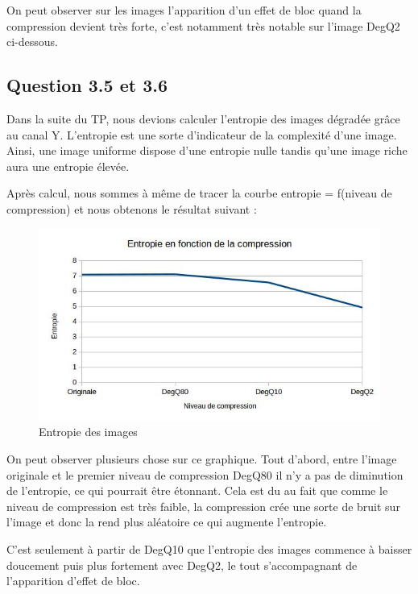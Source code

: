 \documentclass[12pt]{report}
\begin{document}
On peut observer sur les images l'apparition d'un effet de bloc quand la compression devient très forte, c'est notamment très notable sur l'image DegQ2 ci-dessous.

\subsection{Question 3.5 et 3.6}

Dans la suite du TP, nous devions calculer l'entropie des images dégradée grâce au canal Y. L'entropie est une sorte d'indicateur de la complexité d'une image. Ainsi, une image uniforme dispose d'une entropie nulle tandis qu'une image riche aura une entropie élevée.

Après calcul, nous sommes à même de tracer la courbe entropie = f(niveau de compression) et nous obtenons le résultat suivant :

\begin{figure}[H]
\begin{center}
\includegraphics[scale=0.8]{../ImageRes/entropie.jpg} 
\caption{Entropie des images}
\end{center}
\end{figure}

On peut observer plusieurs chose sur ce graphique. Tout d'abord, entre l'image originale et le premier niveau de compression DegQ80 il n'y a pas de diminution de l'entropie, ce qui pourrait être étonnant. Cela est du au fait que comme le niveau de compression est très faible, la compression crée une sorte de bruit sur l'image et donc la rend plus aléatoire ce qui augmente l'entropie. 

C'est seulement à partir de DegQ10 que l'entropie des images commence à baisser doucement puis plus fortement avec DegQ2, le tout s'accompagnant de l'apparition d'effet de bloc.
\end{document}
